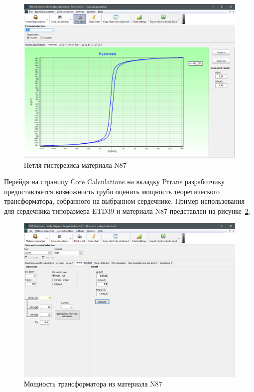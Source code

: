 \documentclass[utf8x, 14pt, oneside, a4paper]{article}
\begin{document}
		\begin{figure}[H]
			\centering
			\includegraphics[width=0.9\linewidth]{"Рисунки/ПетляГистерезисаN87"}
			\caption{Петля гистерезиса материала N87}
			\label{fig:N87_hysteresis}
		\end{figure}
	
		Перейдя на страницу Core Calculations на вкладку Ptrans разработчику предоставляется возможность грубо оценить мощность теоретического трансформатора, собранного на выбранном сердечнике. Пример использования для сердечника типоразмера ETD39 и материала N87 представлен на рисунке~\ref{fig:N87_ETD39_ptrans}.
		
		\begin{figure}[H]
			\centering
			\includegraphics[width=0.9\linewidth]{"Рисунки/МощностьТрансформатора"}
			\caption{Мощность трансформатора из материала N87}
			\label{fig:N87_ETD39_ptrans}
		\end{figure}
	
\end{document}
